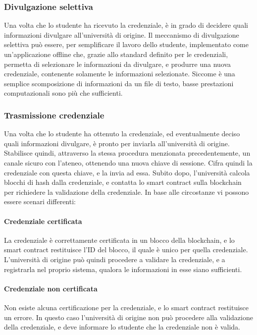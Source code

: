 \documentclass[a4paper,12pt]{article}
\begin{document}
\subsubsection{Divulgazione selettiva}
Una volta che lo studente ha ricevuto la credenziale, è in grado di decidere quali informazioni divulgare all'università di origine. Il meccanismo di divulgazione selettiva può essere, per semplificare il lavoro dello studente, implementato come un'applicazione offline che, grazie allo standard definito per le credenziali, permetta di selezionare le informazioni da divulgare, e produrre una nuova credenziale, contenente solamente le informazioni selezionate.
\newline Siccome è una semplice scomposizione di informazioni da un file di testo, basse prestazioni computazionali sono più che sufficienti.
\subsubsection{Trasmissione credenziale}
Una volta che lo studente ha ottenuto la credenziale, ed eventualmente deciso quali informazioni divulgare, è pronto per inviarla all'università di origine. Stabilisce quindi, attraverso la stessa procedura menzionata precedentemente, un canale sicuro con l'ateneo, ottenendo una nuova chiave di sessione. Cifra quindi la credenziale con questa chiave, e la invia ad essa. Subito dopo, l'università calcola blocchi di hash dalla credenziale, e contatta lo smart contract sulla blockchain per richiedere la validazione della credenziale.
\newline In base alle circostanze vi possono essere scenari differenti:
\paragraph{Credenziale certificata} La credenziale è correttamente certificata in un blocco della blockchain, e lo smart contract restituisce l'ID del blocco, il quale è unico per quella credenziale. L'università di origine può quindi procedere a validare la credenziale, e a registrarla nel proprio sistema, qualora le informazioni in esse siano sufficienti.
\paragraph{Credenziale non certificata} Non esiste alcuna certificazione per la credenziale, e lo smart contract restituisce un errore. In questo caso l'università di origine non può procedere alla validazione della credenziale, e deve informare lo studente che la credenziale non è valida.
\end{document}
